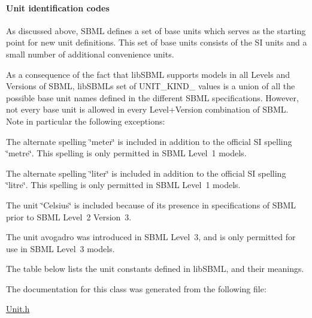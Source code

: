 \paragraph*{\label{_UnitKind_t}%
Unit identification codes}

As discussed above, S\+B\+ML defines a set of base units which serves as the starting point for new unit definitions. This set of base units consists of the SI units and a small number of additional convenience units.

As a consequence of the fact that lib\+S\+B\+ML supports models in all Levels and Versions of S\+B\+ML, lib\+S\+B\+ML\textquotesingle{}s set of {\ttfamily U\+N\+I\+T\+\_\+\+K\+I\+N\+D\+\_\+} values is a union of all the possible base unit names defined in the different S\+B\+ML specifications. However, not every base unit is allowed in every Level+\+Version combination of S\+B\+ML. Note in particular the following exceptions\+: 
\begin{DoxyItemize}
\item The alternate spelling {\ttfamily \char`\"{}meter\char`\"{}} is included in addition to the official SI spelling {\ttfamily \char`\"{}metre\char`\"{}}. This spelling is only permitted in S\+B\+ML Level~1 models.


\item The alternate spelling {\ttfamily \char`\"{}liter\char`\"{}} is included in addition to the official SI spelling {\ttfamily \char`\"{}litre\char`\"{}}. This spelling is only permitted in S\+B\+ML Level~1 models.


\item The unit {\ttfamily \char`\"{}\+Celsius\char`\"{}} is included because of its presence in specifications of S\+B\+ML prior to S\+B\+ML Level~2 Version~3.


\item The unit {\ttfamily avogadro} was introduced in S\+B\+ML Level~3, and is only permitted for use in S\+B\+ML Level~3 models. 
\end{DoxyItemize}

The table below lists the unit constants defined in lib\+S\+B\+ML, and their meanings.

 

The documentation for this class was generated from the following file\+:\begin{DoxyCompactItemize}
\item 
\hyperlink{_unit_8h}{Unit.\+h}\end{DoxyCompactItemize}
